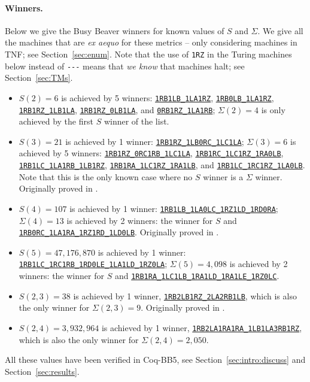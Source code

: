 \documentclass[a4paper,british]{article}
\theoremstyle{definition} %
\numberwithin{equation}{section}
\theoremstyle{definition} %
\newcommand{\tm}[1]{\href{https://bbchallenge.org/#1}{\texttt{\nolinkurl{#1}}}}
\newcommand{\BBtheFifth}{47{,}176{,}870}
\newcommand{\BBTxF}{3{,}932{,}964}
\newcommand{\CoqBB}{Coq-BB5\xspace}
\begin{document}
\paragraph{Winners.} Below we give the Busy Beaver winners for known values of $S$ and $\Sigma$. We give all the machines that are \textit{ex aequo} for these metrics -- only considering machines in TNF; see Section~\ref{sec:enum}. Note that the use of \texttt{1RZ} in the Turing machines below instead of \verb|---| means that \textit{we know} that machines halt; see Section~\ref{sec:TMs}.
\begin{itemize}
    \item $S(2) = 6$ is achieved by 5 winners: \tm{1RB1LB_1LA1RZ}, \tm{1RB0LB_1LA1RZ}, \tm{1RB1RZ_1LB1LA}, \tm{1RB1RZ_0LB1LA}, and \tm{0RB1RZ_1LA1RB}; $\Sigma(2) = 4$ is only achieved by the first $S$ winner of the list.
    \item $S(3) = 21$ is achieved by 1 winner: \tm{1RB1RZ_1LB0RC_1LC1LA}; $\Sigma(3) = 6$ is achieved by 5 winners: \tm{1RB1RZ_0RC1RB_1LC1LA}, \tm{1RB1RC_1LC1RZ_1RA0LB}, \tm{1RB1LC_1LA1RB_1LB1RZ}, \tm{1RB1RA_1LC1RZ_1RA1LB}, and \tm{1RB1LC_1RC1RZ_1LA0LB}. Note that this is the only known case where no $S$ winner is a $\Sigma$ winner. Originally proved in \cite{Lin1963}.
    \item $S(4) = 107$ is achieved by 1 winner: \tm{1RB1LB_1LA0LC_1RZ1LD_1RD0RA}; $\Sigma(4) = 13$ is achieved by 2 winners: the winner for $S$ and \tm{1RB0RC_1LA1RA_1RZ1RD_1LD0LB}. Originally proved in \cite{Brady83}.
    \item $S(5) = \BBtheFifth$ is achieved by 1 winner: \tm{1RB1LC_1RC1RB_1RD0LE_1LA1LD_1RZ0LA}; $\Sigma(5) = 4{,}098$ is achieved by 2 winners: the winner for $S$ and \tm{1RB1RA_1LC1LB_1RA1LD_1RA1LE_1RZ0LC}.
    \item $S(2,3) = 38$ is achieved by 1 winner, \tm{1RB2LB1RZ_2LA2RB1LB}, which is also the only winner for $\Sigma(2,3) = 9$. Originally proved in \cite{LafittePapazian2007}.
    \item $S(2,4) = \BBTxF$ is achieved by 1 winner, \tm{1RB2LA1RA1RA_1LB1LA3RB1RZ}, which is also the only winner for $\Sigma(2,4)=2{,}050$.
\end{itemize}

All these values have been verified in \CoqBB, see Section~\ref{sec:intro:discuss} and Section~\ref{sec:results}.
\end{document}
